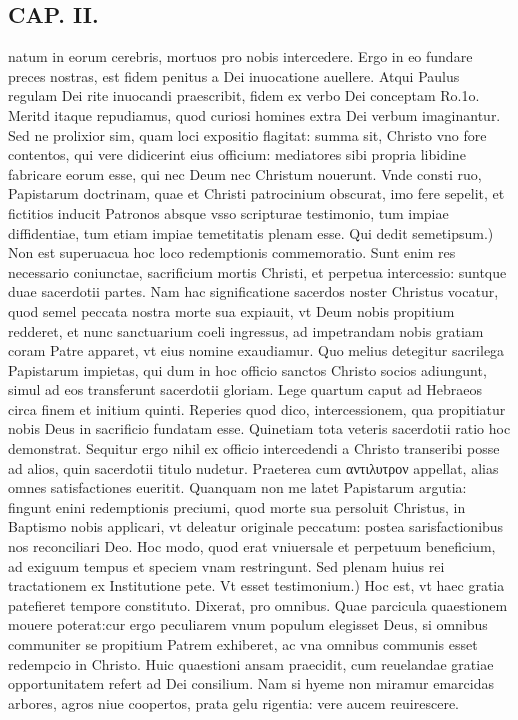 \documentclass{article}
\begin{document}
\begin{pages}
\section*{CAP. II. }
\marginpar{[ p.23 ]}\pstart natum in eorum cerebris, mortuos pro nobis intercedere. Ergo in eo fundare preces nostras, est fidem penitus a Dei inuocatione auellere. Atqui Paulus regulam Dei rite inuocandi praescribit, fidem ex verbo Dei conceptam Ro.1o. Meritd itaque repudiamus, quod curiosi homines extra Dei verbum imaginantur. Sed ne prolixior sim, quam loci expositio flagitat: summa sit, Christo vno fore contentos, qui vere didicerint eius officium: mediatores sibi propria libidine fabricare eorum esse, qui nec Deum nec Christum nouerunt. Vnde consti ruo, Papistarum doctrinam, quae et Christi patrocinium obscurat, imo fere sepelit, et fictitios inducit Patronos absque vsso scripturae testimonio, tum impiae diffidentiae, tum etiam impiae temetitatis plenam esse.  \pend\pstart Qui dedit semetipsum.) Non est superuacua hoc loco redemptionis commemoratio. Sunt enim res necessario coniunctae, sacrificium mortis Christi, et perpetua intercessio: suntque duae sacerdotii partes. Nam hac significatione sacerdos noster Christus vocatur, quod semel peccata nostra morte sua expiauit, vt Deum nobis propitium redderet, et nunc sanctuarium coeli ingressus, ad impetrandam nobis gratiam coram Patre apparet, vt eius nomine exaudiamur. Quo melius detegitur sacrilega Papistarum impietas, qui dum in hoc officio sanctos Christo socios adiungunt, simul ad eos transferunt sacerdotii gloriam. Lege quartum caput ad Hebraeos circa finem et initium quinti. Reperies quod dico, intercessionem, qua propitiatur nobis Deus in sacrificio fundatam esse. Quinetiam tota veteris sacerdotii ratio hoc demonstrat. Sequitur ergo nihil ex officio intercedendi a Christo transeribi posse ad alios, quin sacerdotii titulo nudetur. Praeterea cum αντιλυτρον appellat, alias omnes satisfactiones eueritit. Quanquam non me latet Papistarum argutia: fingunt enini redemptionis preciumi, quod morte sua persoluit Christus, in Baptismo nobis applicari, vt deleatur originale peccatum: postea sarisfactionibus nos reconciliari Deo. Hoc modo, quod erat vniuersale et perpetuum beneficium, ad exiguum tempus et speciem vnam restringunt. Sed plenam huius rei tractationem ex Institutione pete.  \pend\pstart Vt esset testimonium.) Hoc est, vt haec gratia patefieret tempore constituto. Dixerat, pro omnibus. Quae parcicula quaestionem mouere poterat:cur ergo peculiarem vnum populum elegisset Deus, si omnibus communiter se propitium Patrem exhiberet, ac vna omnibus communis esset redempcio in Christo. Huic quaestioni ansam praecidit, cum reuelandae gratiae opportunitatem refert ad Dei consilium. Nam si hyeme non miramur emarcidas arbores, agros niue coopertos, prata gelu rigentia: vere aucem reuirescere.  \pend

\end{pages}
\end{document}
